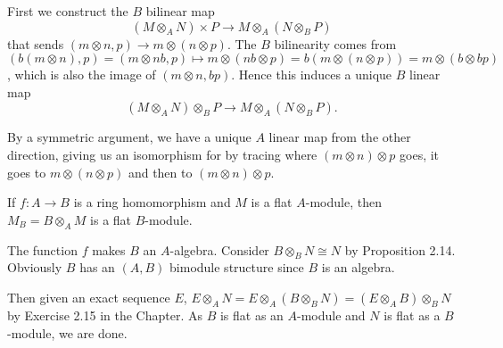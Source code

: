 \begin{questions}
\begin{solution}
		First we construct the $B$ bilinear map
		\[
			(M \otimes _A N) \times P \to M \otimes _A (N \otimes _B P)
		\]
		that sends $(m \otimes n, p) \to m \otimes (n \otimes p)$.
		The $B$ bilinearity comes from $(b(m \otimes n),p) = (m \otimes nb,p) \mapsto m \otimes (nb \otimes p) = b(m \otimes (n \otimes p)) = m \otimes (b \otimes bp) $, which is also the image of $(m \otimes n, bp)$.
		Hence this induces a unique $B$ linear map
		\[
			(M \otimes_A N) \otimes_B P \to M \otimes _A (N \otimes _B P)
		.\]

		By a symmetric argument, we have a unique $A$ linear map from the other direction, giving us an isomorphism for by tracing where $(m \otimes n) \otimes p$ goes, it goes to $m \otimes (n \otimes p)$ and then to $(m \otimes n) \otimes p$.
	\end{solution}

	\question If $f: A\to B$ is a ring homomorphism and $M$ is a flat $A$-module, then $M_B = B \otimes _A M$ is a flat $B$-module.
	\begin{solution}
		The function $f$ makes $B$ an $A$-algebra.
		Consider $B \otimes_B N \cong N$ by Proposition 2.14.
		Obviously $B$ has an $(A,B)$ bimodule structure since $B$ is an algebra.

		Then given an exact sequence $E $, $E \otimes_A N = E \otimes_A (B \otimes_B N) = (E \otimes_A B) \otimes_B N$ by Exercise 2.15 in the Chapter.
		As $B$ is flat as an $A$-module and $N$ is flat as a $B$-module, we are done.
	\end{solution}
\end{questions}

